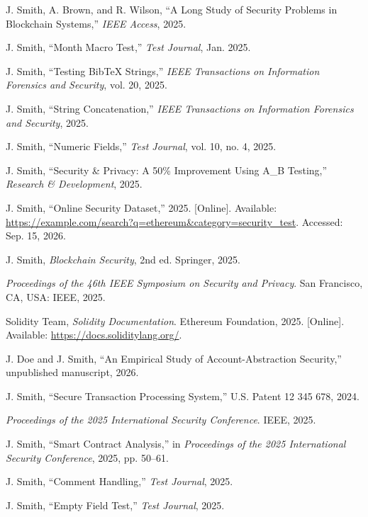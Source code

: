 J. Smith, A. Brown, and R. Wilson, ``A Long Study of Security Problems in Blockchain Systems,'' \emph{IEEE Access}, 2025.

J. Smith, ``Month Macro Test,'' \emph{Test Journal}, Jan. 2025.

J. Smith, ``Testing BibTeX Strings,'' \emph{IEEE Transactions on Information Forensics and Security}, vol. 20, 2025.

J. Smith, ``String Concatenation,'' \emph{IEEE Transactions on Information Forensics and Security}, 2025.

J. Smith, ``Numeric Fields,'' \emph{Test Journal}, vol. 10, no. 4, 2025.

J. Smith, ``Security \& Privacy: A 50\% Improvement Using A\_B Testing,'' \emph{Research \& Development}, 2025.

J. Smith, ``Online Security Dataset,'' 2025. [Online]. Available: \url{https://example.com/search?q=ethereum&category=security_test}. Accessed: Sep. 15, 2026.

J. Smith, \emph{Blockchain Security}, 2nd ed. Springer, 2025.

\emph{Proceedings of the 46th IEEE Symposium on Security and Privacy}. San Francisco, CA, USA: IEEE, 2025.

Solidity Team, \emph{Solidity Documentation}. Ethereum Foundation, 2025. [Online]. Available: \url{https://docs.soliditylang.org/}.

J. Doe and J. Smith, ``An Empirical Study of Account-Abstraction Security,'' unpublished manuscript, 2026.

J. Smith, ``Secure Transaction Processing System,'' U.S. Patent 12 345 678, 2024.

\emph{Proceedings of the 2025 International Security Conference}. IEEE, 2025.

J. Smith, ``Smart Contract Analysis,'' in \emph{Proceedings of the 2025 International Security Conference}, 2025, pp. 50--61.

J. Smith, ``Comment Handling,'' \emph{Test Journal}, 2025.

J. Smith, ``Empty Field Test,'' \emph{Test Journal}, 2025.

